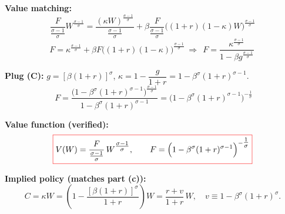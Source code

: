\documentclass[12pt]{article}
\begin{document}
\textbf{Value matching:}
\[
\frac{F}{\tfrac{\sigma-1}{\sigma}}W^{\tfrac{\sigma-1}{\sigma}}
=\frac{(\kappa W)^{\tfrac{\sigma-1}{\sigma}}}{\tfrac{\sigma-1}{\sigma}}
+\beta\frac{F}{\tfrac{\sigma-1}{\sigma}}\big((1+r)(1-\kappa)W\big)^{\tfrac{\sigma-1}{\sigma}}
\]
\[
F=\kappa^{\tfrac{\sigma-1}{\sigma}}
+\beta F\big((1+r)(1-\kappa)\big)^{\tfrac{\sigma-1}{\sigma}}
\ \Rightarrow\
\boxed{\ F=\frac{\kappa^{\tfrac{\sigma-1}{\sigma}}}{1-\beta g^{\tfrac{\sigma-1}{\sigma}}}\ }
\tag{D}
\]

\textbf{Plug (C):} \(g=[\beta(1+r)]^{\sigma}\), \(\kappa=1-\dfrac{g}{1+r}=
1-\beta^{\sigma}(1+r)^{\sigma-1}\).
\[
\boxed{\ 
F=\frac{\Big(1-\beta^{\sigma}(1+r)^{\sigma-1}\Big)^{\tfrac{\sigma-1}{\sigma}}}
{\,1-\beta^{\sigma}(1+r)^{\sigma-1}\,}
=\Big(1-\beta^{\sigma}(1+r)^{\sigma-1}\Big)^{-\tfrac{1}{\sigma}}
}
\]

\textbf{Value function (verified):}
\[
\fcolorbox{red}{white}{$\displaystyle
V(W)=\frac{F}{\tfrac{\sigma-1}{\sigma}}\,W^{\tfrac{\sigma-1}{\sigma}},
\qquad
F=\Big(1-\beta^{\sigma}(1+r)^{\sigma-1}\Big)^{-\tfrac{1}{\sigma}}
$}
\]

\textbf{Implied policy (matches part (c)):}
\[
C=\kappa W
=\left(1-\frac{[\beta(1+r)]^{\sigma}}{1+r}\right)W
=\frac{r+v}{1+r}\,W,\quad v\equiv 1-\beta^{\sigma}(1+r)^{\sigma}.
\]
\end{document}
